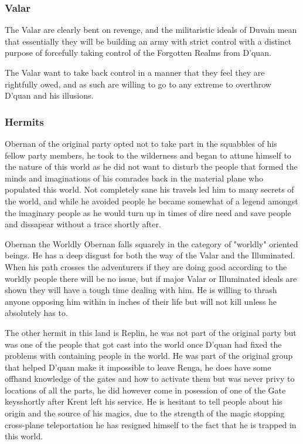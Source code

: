 \documentclass[10pt,twoside,twocolumn]{article}
\begin{document}
\subsubsection{Valar}
The Valar are clearly bent on revenge, and the militaristic ideals of Duvain mean that essentially they will be building an army with strict control with a distinct purpose of forcefully taking control of the Forgotten Realms from D'quan.

The Valar want to take back control in a manner that they feel they are rightfully owed, and as such are willing to go to any extreme to overthrow D'quan and his illusions.

\subsubsection{Hermits}
Obernan of the original party opted not to take part in the squabbles of his fellow party members, he took to the wilderness and began to attune himself to the nature of this world as he did not want to disturb the people that formed the minds and imaginations of his comrades back in the material plane who populated this world. Not completely sane his travels led him to many secrets of the world, and while he avoided people he became somewhat of a legend amongst the imaginary people as he would turn up in times of dire need and save people and dissapear without a trace shortly after.

\begin{commentbox}{Obernan the Worldly}
Obernan falls squarely in the category of "worldly" oriented beings. He has a deep disgust for both the way of the Valar and the Illuminated. When his path crosses the adventurers if they are doing good according to the worldly people there will be no issue, but if major Valar or Illuminated ideals are shown they will have a tough time dealing with him. He is willing to thrash anyone opposing him within in inches of their life but will not kill unless he absolutely has to.
\end{commentbox}

The other hermit in this land is Replin, he was not part of the original party but was one of the people that got cast into the world once D'quan had fixed the problems with containing people in the world. He was part of the original group that helped D'quan make it impossible to leave Renga, he does have some offhand knowledge of the gates and how to activate them but was never privy to locations of all the parts, he did however come in posession of one of the Gate keysshortly after Krent left his service. He is hesitant to tell people about his origin and the source of his magics, due to the strength of the magic stopping cross-plane teleportation he has resigned himself to the fact that he is trapped in this world.
\end{document}
